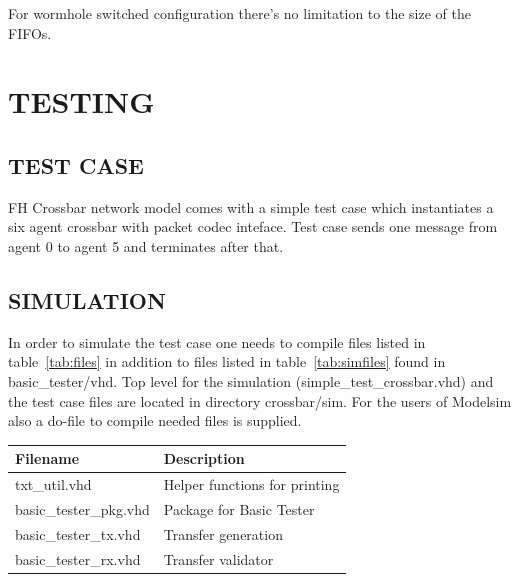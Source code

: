 \documentclass[a4paper,10pt,oneside,final]{article}
\def\deftablecolora{blue!10!white}
\def\deftablecolorb{white}
\begin{document}
\vspace{0.4cm}
\noindent
For wormhole switched configuration there's no limitation to the size
of the FIFOs.



\newpage
\section{TESTING}

\subsection{TEST CASE}

FH Crossbar network model comes with a simple test case which instantiates
a six agent crossbar with packet codec inteface. Test case sends one message
from agent 0 to agent 5 and terminates after that.

\subsection{SIMULATION}

In order to simulate the test case one needs to compile files listed
in table~\ref{tab:files} in addition to files listed in
table~\ref{tab:simfiles} found in basic\_tester/vhd. Top level for the
simulation (simple\_test\_crossbar.vhd) and the test case files are
located in directory crossbar/sim. For the users of Modelsim also a
do-file to compile needed files is supplied.


\begin{center}
  \rowcolors{3}{\deftablecolora}{\deftablecolorb}

  \label{tab:simfiles}
  \begin{tabularx}{\textwidth}{|lX|}
    \hline
    Filename   & Description\\
    \hline
    txt\_util.vhd          & Helper functions for printing\\
    basic\_tester\_pkg.vhd & Package for Basic Tester\\
    basic\_tester\_tx.vhd  & Transfer generation\\
    basic\_tester\_rx.vhd  & Transfer validator\\
    \hline
  \end{tabularx}  
\end{center}
\end{document}
